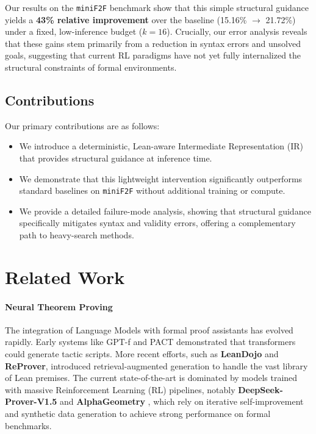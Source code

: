 \documentclass{article}
\begin{document}
Our results on the \texttt{miniF2F} benchmark show that this simple structural guidance yields a \textbf{43\% relative improvement} over the baseline (15.16\% $\to$ 21.72\%) under a fixed, low-inference budget ($k=16$). Crucially, our error analysis reveals that these gains stem primarily from a reduction in syntax errors and unsolved goals, suggesting that current RL paradigms have not yet fully internalized the structural constraints of formal environments.

\subsection{Contributions}
Our primary contributions are as follows:
\begin{itemize}
    \item We introduce a deterministic, Lean-aware Intermediate Representation (IR) that provides structural guidance at inference time.
    \item We demonstrate that this lightweight intervention significantly outperforms standard baselines on \texttt{miniF2F} without additional training or compute.
    \item We provide a detailed failure-mode analysis, showing that structural guidance specifically mitigates syntax and validity errors, offering a complementary path to heavy-search methods.
\end{itemize}

\section{Related Work}

\paragraph{Neural Theorem Proving}
The integration of Language Models with formal proof assistants has evolved rapidly. Early systems like GPT-f \cite{polu2020generative} and PACT \cite{han2021proof} demonstrated that transformers could generate tactic scripts. More recent efforts, such as \textbf{LeanDojo} \cite{yang2023leandojo} and \textbf{ReProver}, introduced retrieval-augmented generation to handle the vast library of Lean premises. The current state-of-the-art is dominated by models trained with massive Reinforcement Learning (RL) pipelines, notably \textbf{DeepSeek-Prover-V1.5} \cite{xin2024deepseek} and \textbf{AlphaGeometry} \cite{trinh2024solving}, which rely on iterative self-improvement and synthetic data generation to achieve strong performance on formal benchmarks.
\end{document}
